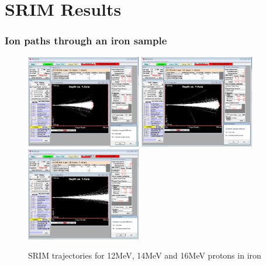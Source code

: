 \chapter{SRIM Results}



\FloatBarrier
\subsection{Ion paths through an iron sample}


\begin{figure}[!htb]
  \begin{center}
    \includegraphics[width=5.0cm]{appendix/srim_data/12MeV.png}
    \includegraphics[width=5.0cm]{appendix/srim_data/14MeV.png}
    \includegraphics[width=5.0cm]{appendix/srim_data/16MeV.png}
    \caption{SRIM trajectories for 12MeV, 14MeV and 16MeV protons in iron}
    \label{fig:srimiron-12-14-16}
  \end{center}
\end{figure}

